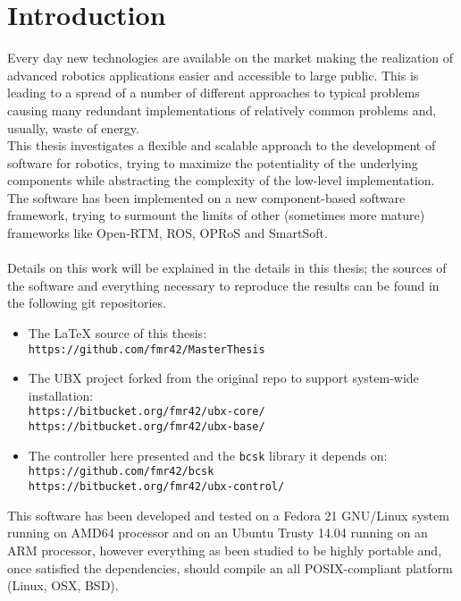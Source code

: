 \chapter{Introduction}
\label{ch:introduction} 
Every day new technologies are available on the market making the realization of advanced robotics applications easier and accessible to large public. This is leading to a spread of a  number of different approaches to typical problems causing many redundant implementations of relatively common problems and, usually, waste of energy.\\
This thesis investigates a flexible and scalable approach to the development of software for robotics, trying to maximize the potentiality of the underlying components while abstracting the complexity of the low-level implementation. The software has been implemented on a new component-based software framework, trying to surmount the limits of other (sometimes more mature) frameworks like Open-RTM, ROS, OPRoS and SmartSoft.\\
\\
Details on this work will be explained in the details in this thesis; the sources of the software and everything necessary to reproduce the results can be found in the following git repositories.
\begin{itemize}
	\item The LaTeX source of this thesis:\\
	\texttt{https://github.com/fmr42/MasterThesis}\\
	
	\item The UBX project forked from the original repo to support system-wide installation:\\
	\texttt{https://bitbucket.org/fmr42/ubx-core/}\\
	\texttt{https://bitbucket.org/fmr42/ubx-base/}\\
	
	\item The controller here presented and the \texttt{bcsk} library it depends on:\\
	\texttt{https://github.com/fmr42/bcsk}\\
	\texttt{https://bitbucket.org/fmr42/ubx-control/}\\
\end{itemize}

This software has been developed and tested on a Fedora 21 GNU/Linux system running on AMD64 processor and on an Ubuntu Trusty 14.04 running on an ARM processor, however everything as been studied to be highly portable and, once satisfied the dependencies, should compile an all POSIX-compliant platform (Linux, OSX, BSD).
